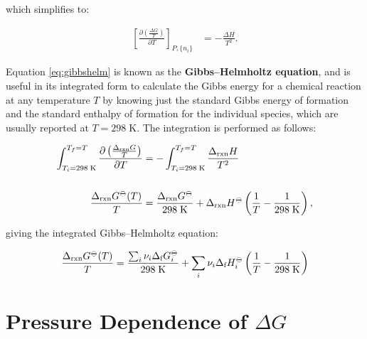 \documentclass[
  9pt,
]{extbook}
\theoremstyle{definition}
\theoremstyle{definition}
\theoremstyle{definition}
\theoremstyle{definition}
\theoremstyle{remark}
\begin{document}
which simplifies to:

\begin{equation}
\begin{aligned}
\left[ \frac{\partial\left( \frac{\Delta G}{T} \right)}{\partial T} \right]_{P,\{n_i\}} &= - \frac{\Delta H}{T^2}.
\end{aligned}
\label{eq:gibbshelm}
\end{equation}

Equation \eqref{eq:gibbshelm} is known as the \textbf{Gibbs--Helmholtz equation}, and is useful in its integrated form to calculate the Gibbs energy for a chemical reaction at any temperature \(T\) by knowing just the standard Gibbs energy of formation and the standard enthalpy of formation for the individual species, which are usually reported at \(T=298\;\text{K}\). The integration is performed as follows:

\begin{equation}
\begin{aligned}
\int_{T_i=298 \;\text{K}}^{T_f=T}  \frac{\partial\left( \frac{\Delta_{\text{rxn}} G}{T} \right)}{\partial T} &=  - \int_{T_i=298 \;\text{K}}^{T_f=T}  \frac{\Delta_{\text{rxn}} H}{T^2} \\ \\ \frac{\Delta_{\text{rxn}} G^{-\kern-6pt{\ominus}\kern-6pt-}(T)}{T} &=  \frac{\Delta_{\text{rxn}} G^{-\kern-6pt{\ominus}\kern-6pt-}}{298 \;\text{K}} + \Delta_{\text{rxn}} H^{-\kern-6pt{\ominus}\kern-6pt-}\left( \frac{1}{T} -\frac{1}{298 \;\text{K}} \right),
\end{aligned}
\label{eq:gibbshelmIbase}
\end{equation}

giving the integrated Gibbs--Helmholtz equation:

\begin{equation}
\frac{\Delta_{\text{rxn}} G^{-\kern-6pt{\ominus}\kern-6pt-}(T)}{T} =  \frac{\sum_i \nu_i \Delta_{\text{f}} G_i^{-\kern-6pt{\ominus}\kern-6pt-}}{298 \;\text{K}} + \sum_i \nu_i \Delta_{\text{f}} H_i^{-\kern-6pt{\ominus}\kern-6pt-}\left( \frac{1}{T} -\frac{1}{298 \;\text{K}} \right)
\label{eq:gibbshelmI}
\end{equation}

\section{\texorpdfstring{Pressure Dependence of \(\Delta G\)}{Pressure Dependence of \textbackslash Delta G}}\label{pressure-dependence-of-delta-g}
\end{document}
